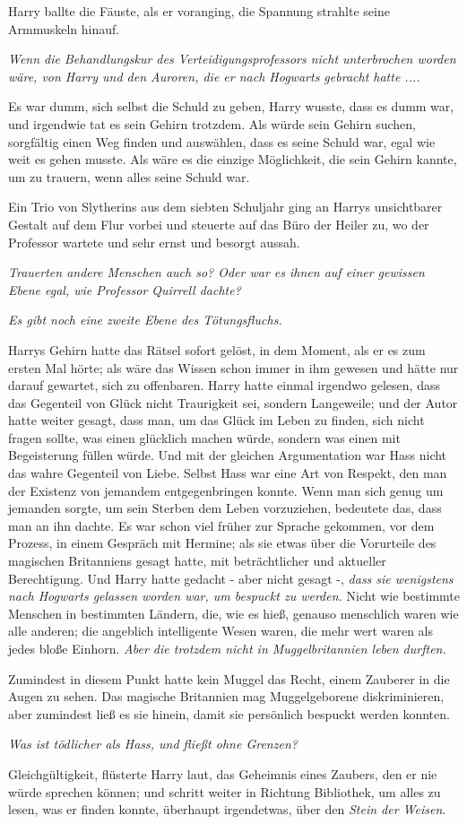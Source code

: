 Harry ballte die Fäuste, als er voranging, die Spannung strahlte seine
Armmuskeln hinauf.

\emph{Wenn die Behandlungskur des Verteidigungsprofessors nicht unterbrochen
worden wäre, von Harry und den Auroren, die er nach Hogwarts gebracht hatte ....}

Es war dumm, sich selbst die Schuld zu geben, Harry wusste, dass es dumm war,
und irgendwie tat es sein Gehirn trotzdem. Als würde sein Gehirn suchen,
sorgfältig einen Weg finden und auswählen, dass es seine Schuld war, egal wie
weit es gehen musste. Als wäre es die einzige Möglichkeit, die sein Gehirn
kannte, um zu trauern, wenn alles seine Schuld war.

Ein Trio von Slytherins aus dem siebten Schuljahr ging an Harrys unsichtbarer
Gestalt auf dem Flur vorbei und steuerte auf das Büro der Heiler zu, wo der
Professor wartete und sehr ernst und besorgt aussah.

\emph{Trauerten andere Menschen auch so? Oder war es ihnen auf einer gewissen
Ebene egal, wie Professor Quirrell dachte?}

\emph{Es gibt noch eine zweite Ebene des Tötungsfluchs.}

Harrys Gehirn hatte das Rätsel sofort gelöst, in dem Moment, als er es zum
ersten Mal hörte; als wäre das Wissen schon immer in ihm gewesen und hätte nur
darauf gewartet, sich zu offenbaren. Harry hatte einmal irgendwo gelesen, dass
das Gegenteil von Glück nicht Traurigkeit sei, sondern Langeweile; und der Autor
hatte weiter gesagt, dass man, um das Glück im Leben zu finden, sich nicht
fragen sollte, was einen glücklich machen würde, sondern was einen mit
Begeisterung füllen würde. Und mit der gleichen Argumentation war Hass nicht das
wahre Gegenteil von Liebe. Selbst Hass war eine Art von Respekt, den man der
Existenz von jemandem entgegenbringen konnte. Wenn man sich genug um jemanden
sorgte, um sein Sterben dem Leben vorzuziehen, bedeutete das, dass man an ihn
dachte. Es war schon viel früher zur Sprache gekommen, vor dem Prozess, in einem
Gespräch mit Hermine; als sie etwas über die Vorurteile des magischen
Britanniens gesagt hatte, mit beträchtlicher und aktueller Berechtigung. Und
Harry hatte gedacht - aber nicht gesagt -, \emph{dass sie wenigstens nach
Hogwarts gelassen worden war, um bespuckt zu werden.} Nicht wie bestimmte
Menschen in bestimmten Ländern, die, wie es hieß, genauso menschlich waren wie
alle anderen; die angeblich intelligente Wesen waren, die mehr wert waren als
jedes bloße Einhorn. \emph{ Aber die trotzdem nicht in Muggelbritannien leben
durften.}

Zumindest in diesem Punkt hatte kein Muggel das Recht, einem Zauberer in die
Augen zu sehen. Das magische Britannien mag Muggelgeborene diskriminieren, aber
zumindest ließ es sie hinein, damit sie persönlich bespuckt werden konnten.

\emph{Was ist tödlicher als Hass, und fließt ohne Grenzen?}

\glqq{}Gleichgültigkeit\grqq{}, flüsterte Harry laut, das Geheimnis eines
Zaubers, den er nie würde sprechen können; und schritt weiter in Richtung
Bibliothek, um alles zu lesen, was er finden konnte, überhaupt irgendetwas, über
den \emph{Stein der Weisen}.

